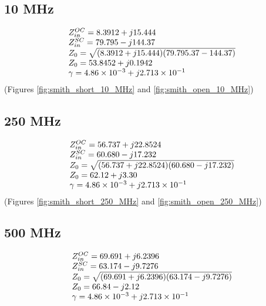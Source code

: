 \documentclass[conference]{IEEEtran}
\begin{document}
\subsection{10 MHz}
\begin{equation}{\label{eq:z_0_10_MHz}}
  \begin{array}{ll}
    Z_{in}^{OC} = 8.3912 + j15.444\\
    Z_{in}^{SC} = 79.795 - j144.37\\
    Z_0 = \sqrt{(8.3912 + j15.444)(79.795.37 - 144.37)}\\
    Z_0 = 53.8452 + j0.1942\\
    \gamma = \num{4.86e-3} + j \num{2.713e-1}
  \end{array}
\end{equation}
(Figures \ref{fig:smith_short_10_MHz} and \ref{fig:smith_open_10_MHz})

\subsection{250 MHz}
\begin{equation}{\label{eq:z_0_250_MHz}}
  \begin{array}{ll}
    Z_{in}^{OC} = 56.737 + j22.8524\\
    Z_{in}^{SC} = 60.680 - j17.232\\
    Z_0 = \sqrt{(56.737 + j22.8524)(60.680 - j17.232)}\\
    Z_0 = 62.12 + j3.30\\
    \gamma = \num{4.86e-3} + j\num{2.713e-1}
  \end{array}
\end{equation}
(Figures \ref{fig:smith_short_250_MHz} and \ref{fig:smith_open_250_MHz})

\subsection{500 MHz}
\begin{equation}{\label{eq:z_0_500_MHz}}
  \begin{array}{ll}
    Z_{in}^{OC} = 69.691 + j6.2396\\
    Z_{in}^{SC} = 63.174 - j9.7276\\
    Z_0 = \sqrt{(69.691 + j6.2396)(63.174 - j9.7276)}\\
    Z_0 = 66.84 - j2.12\\
    \gamma = \num{4.86e-3} + j \num{2.713e-1}
  \end{array}
\end{equation}
\end{document}
